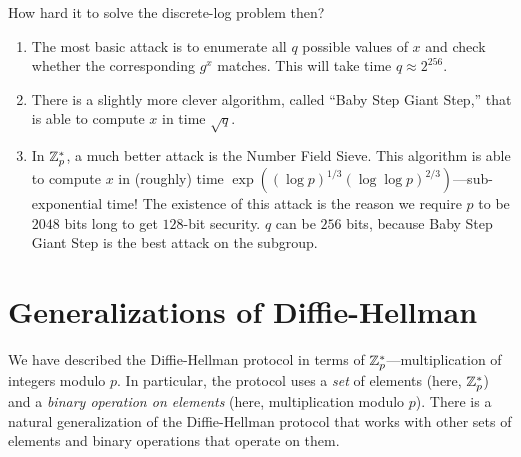 How hard it to solve the discrete-log problem then?
\begin{enumerate}
	\item The most basic attack is to enumerate all $q$ possible values of $x$ and check whether the corresponding $g^x$ matches. This will take time $q \approx 2^{256}$.
	\item There is a slightly more clever algorithm, called ``Baby Step Giant Step,'' that is able to compute $x$ in time $\sqrt{q}$.
  \item In $\mathbb{Z}^*_p$,
    a much better attack is the Number Field Sieve.
    This algorithm is able to compute $x$ in (roughly) time $\exp((\log p)^{1/3} (\log \log p)^{2/3})$---sub-exponential time!
    The existence of this attack is the reason we require $p$ to be $2048$ bits long to 
    get $128$-bit security. $q$ can be $256$ bits, because Baby Step Giant Step is the best attack on the subgroup.
\end{enumerate}






\section{Generalizations of Diffie-Hellman}

We have described the Diffie-Hellman protocol in terms
of $\mathbb{Z}^*_p$---multiplication of integers modulo $p$.
In particular, the protocol uses a \emph{set} of elements (here, $\mathbb{Z}^*_p$)
and a \emph{binary operation on elements} (here, multiplication modulo $p$).
There is a natural generalization of the Diffie-Hellman
protocol that works with other sets of elements and
binary operations that operate on them.

